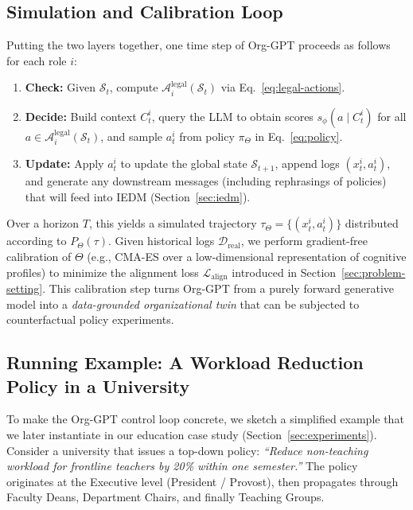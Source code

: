 \documentclass{article}
\begin{document}
\subsection{Simulation and Calibration Loop}
\label{sec:simulation}

Putting the two layers together, one time step of Org-GPT proceeds as follows for each role $i$:
\begin{enumerate}
    \item \textbf{Check:} Given $\mathcal{S}_t$, compute $\mathcal{A}^{\text{legal}}_i(\mathcal{S}_t)$ via Eq.~\eqref{eq:legal-actions}.
    \item \textbf{Decide:} Build context $C_t^i$, query the LLM to obtain scores $s_{\phi}(a \mid C_t^i)$ for all $a \in \mathcal{A}^{\text{legal}}_i(\mathcal{S}_t)$, and sample $a_t^i$ from policy $\pi_{\Theta}$ in Eq.~\eqref{eq:policy}.
    \item \textbf{Update:} Apply $a_t^i$ to update the global state $\mathcal{S}_{t+1}$, append logs $(x_t^i, a_t^i)$, and generate any downstream messages (including rephrasings of policies) that will feed into IEDM (Section~\ref{sec:iedm}).
\end{enumerate}

Over a horizon $T$, this yields a simulated trajectory $\tau_{\Theta} = \{(x_t^i, a_t^i)\}$ distributed according to $P_{\Theta}(\tau)$.
Given historical logs $\mathcal{D}_{\text{real}}$, we perform gradient-free calibration of $\Theta$ (e.g., CMA-ES over a low-dimensional representation of cognitive profiles) to minimize the alignment loss $\mathcal{L}_{\text{align}}$ introduced in Section~\ref{sec:problem-setting}.
This calibration step turns Org-GPT from a purely forward generative model into a \emph{data-grounded organizational twin} that can be subjected to counterfactual policy experiments.

\subsection{Running Example: A Workload Reduction Policy in a University}

To make the Org-GPT control loop concrete, we sketch a simplified example that we later instantiate in our education case study (Section~\ref{sec:experiments}). Consider a university that issues a top-down policy: \emph{``Reduce non-teaching workload for frontline teachers by 20\% within one semester.''} The policy originates at the Executive level (President / Provost), then propagates through Faculty Deans, Department Chairs, and finally Teaching Groups.
\end{document}
